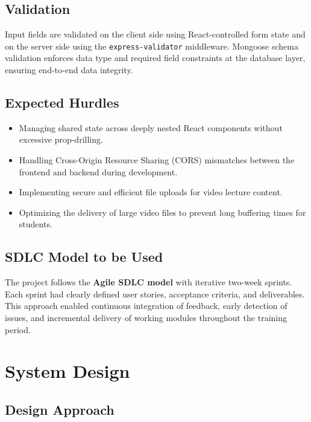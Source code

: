 \documentclass[12pt, a4paper, oneside]{report}
\begin{document}
\section{Validation}

Input fields are validated on the client side using React-controlled form state and on the server side using the \texttt{express-validator} middleware. Mongoose schema validation enforces data type and required field constraints at the database layer, ensuring end-to-end data integrity.

\section{Expected Hurdles}

\begin{itemize}[leftmargin=1.5cm, itemsep=2pt]
  \item Managing shared state across deeply nested React components without excessive prop-drilling.
  \item Handling Cross-Origin Resource Sharing (CORS) mismatches between the frontend and backend during development.
  \item Implementing secure and efficient file uploads for video lecture content.
  \item Optimizing the delivery of large video files to prevent long buffering times for students.
\end{itemize}

\section{SDLC Model to be Used}

The project follows the \textbf{Agile SDLC model} with iterative two-week sprints. Each sprint had clearly defined user stories, acceptance criteria, and deliverables. This approach enabled continuous integration of feedback, early detection of issues, and incremental delivery of working modules throughout the training period.

\chapter{System Design}

\section{Design Approach}
\end{document}

